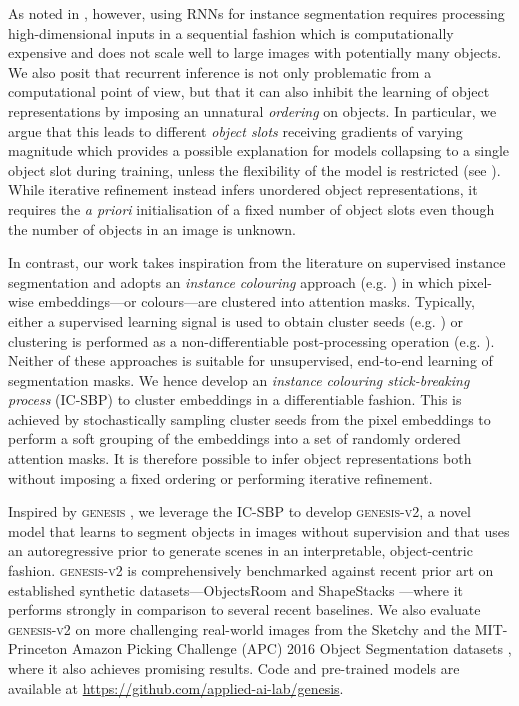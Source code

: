\documentclass{article}
\begin{document}
As noted in \citet{novotny2018semi}, however, using RNNs for instance segmentation requires processing high-dimensional inputs in a sequential fashion which is computationally expensive and does not scale well to large images with potentially many objects.
We also posit that recurrent inference is not only problematic from a computational point of view, but that it can also inhibit the learning of object representations by imposing an unnatural \emph{ordering} on objects.
In particular, we argue that this leads to different \emph{object slots} receiving gradients of varying magnitude which provides a possible explanation for models collapsing to a single object slot during training, unless the flexibility of the model is restricted (see \cite{engelcke2020reconstruction}).
While iterative refinement instead infers unordered object representations, it requires the \emph{a priori} initialisation of a fixed number of object slots even though the number of objects in an image is unknown.

In contrast, our work takes inspiration from the literature on supervised instance segmentation and adopts an \emph{instance colouring} approach (e.g. \cite{novotny2018semi,fathi2017semantic,bai2017deep,debrabandere2017semantic}) in which pixel-wise embeddings---or colours---are clustered into attention masks.
Typically, either a supervised learning signal is used to obtain cluster seeds (e.g. \cite{novotny2018semi,fathi2017semantic}) or clustering is performed as a  non-differentiable post-processing operation (e.g. \cite{bai2017deep,debrabandere2017semantic}).
Neither of these approaches is suitable for unsupervised, end-to-end learning of segmentation masks.
We hence develop an \emph{instance colouring stick-breaking process} (IC-SBP) to cluster embeddings in a differentiable fashion.
This is achieved by stochastically sampling cluster seeds from the pixel embeddings to perform a soft grouping of the embeddings into a set of randomly ordered attention masks.
It is therefore possible to infer object representations both without imposing a fixed ordering or performing iterative refinement.

Inspired by \textsc{genesis} \cite{engelcke2020genesis}, we leverage the IC-SBP to develop \textsc{genesis-v2}, a novel model that learns to segment objects in images without supervision and that uses an autoregressive prior to generate scenes in an interpretable, object-centric fashion.
\textsc{genesis-v2} is comprehensively benchmarked against recent prior art \cite{burgess2019monet,engelcke2020genesis,locatello2020object} on established synthetic datasets---ObjectsRoom \cite{multiobjectdatasets19} and ShapeStacks \cite{groth2018shapestacks}---where it performs strongly in comparison to several recent baselines.
We also evaluate \textsc{genesis-v2} on more challenging real-world images from the Sketchy \cite{cabi2019scaling} and the MIT-Princeton Amazon Picking Challenge (APC) 2016 Object Segmentation datasets \cite{zeng2016multi}, where it also achieves promising results.
Code and pre-trained models are available at \url{https://github.com/applied-ai-lab/genesis}.
\end{document}
